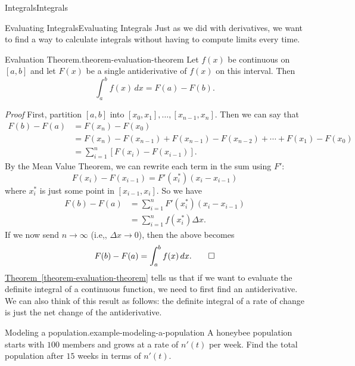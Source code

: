 \documentclass[10pt,]{book}
\makeatletter
\renewcommand*{\proofname}{Proof}
\renewenvironment{proof}[1][\proofname]{\par
  \pushQED{\qed}%
  \normalfont \topsep6\p@\@plus6\p@\relax
  \trivlist
  \item\relax
    {\itshape
    #1\@addpunct{.}}\hspace\labelsep\ignorespaces
}{%
  \popQED\endtrivlist\@endpefalse
}
\numberwithin{equation}{section}
\makeatother
\begin{document}
\begin{chapterptx}{Integrals}{}{Integrals}{}{}
\begin{sectionptx}{Evaluating Integrals}{}{Evaluating Integrals}{}{}
\hypertarget{p-443}{}%
Just as we did with derivatives, we want to find a way to calculate integrals without having to compute limits every time.%
\begin{theorem}{Evaluation Theorem.}{}{theorem-evaluation-theorem}%
\hypertarget{p-444}{}%
Let \(f(x)\) be continuous on \([a,b]\) and let \(F(x)\) be a single antiderivative of \(f(x)\) on this interval. Then%
\begin{equation*}
\int_{a}^{b}f(x)\,dx = F(a) - F(b).
\end{equation*}
%
\end{theorem}
\begin{proof}\hypertarget{proof-10}{}
\hypertarget{p-445}{}%
First, partition \([a,b]\) into \([x_{0},x_{1}],\ldots,[x_{n-1},x_{n}]\). Then we can say that%
\begin{align*}
F(b) - F(a) & = F(x_{n}) - F(x_{0}) \\
& = F(x_{n}) - F(x_{n-1}) + F(x_{n-1}) - F(x_{n-2}) + \cdots + F(x_{1}) - F(x_{0}) \\
& = \sum_{i=1}^{n}[F(x_{i}) - F(x_{i-1})]. 
\end{align*}
By the Mean Value Theorem, we can rewrite each term in the sum using \(F'\):%
\begin{equation*}
F(x_{i}) - F(x_{i-1}) = F'(x_{i}^{*})(x_{i} - x_{i-1})
\end{equation*}
where \(x_{i}^{*}\) is just some point in \([x_{i-1},x_{i}]\). So we have%
\begin{align*}
F(b) - F(a) & = \sum_{i=1}^{n}F'(x_{i}^{*})(x_{i} - x_{i-1}) \\
& = \sum_{i=1}^{n}f(x_{i}^{*})\Delta x. 
\end{align*}
If we now send \(n\to\infty\) (i.e,, \(\Delta x\to 0\)), then the above becomes%
\begin{equation*}
F(b) - F(a) = \int_{a}^{b}f(x)\,dx.\qedhere
\end{equation*}
%
\end{proof}
\hypertarget{p-446}{}%
\hyperref[theorem-evaluation-theorem]{Theorem~\ref{theorem-evaluation-theorem}} tells us that if we want to evaluate the definite integral of a continuous function, we need to first find an antiderivative. We can also think of this result as follows: the definite integral of a rate of change is just the net change of the antiderivative.%
\begin{example}{Modeling a population.}{example-modeling-a-population}%
\hypertarget{p-447}{}%
A honeybee population starts with \(100\) members and grows at a rate of \(n'(t)\) per week. Find the total population after \(15\) weeks in terms of \(n'(t)\).%

\end{example}
\end{sectionptx}
\end{chapterptx}
\end{document}
